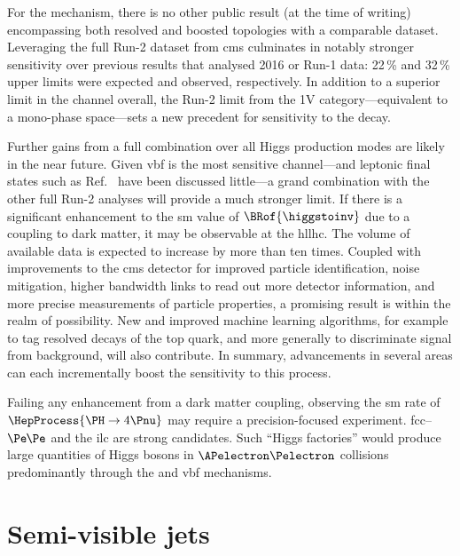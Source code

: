 For the \VH mechanism, there is no other public result (at the time of writing) encompassing both resolved and boosted topologies with a comparable dataset. Leveraging the full Run-2 dataset from \acrshort{cms} culminates in notably stronger sensitivity over previous results that analysed 2016 or Run-1 data: 22\,\% and 32\,\% upper limits were expected and observed, respectively. In addition to a superior limit in the \VH channel overall, the Run-2 limit from the 1V category---equivalent to a mono-\PVec phase space---sets a new precedent for sensitivity to the \higgstoinv decay.

Further gains from a full combination over all Higgs production modes are likely in the near future. Given \acrshort{vbf} is the most sensitive channel---and leptonic final states such as Ref.~ have been discussed little---a grand combination with the other full Run-2 analyses will provide a much stronger limit. If there is a significant enhancement to the \acrshort{sm} value of $\BRof{\higgstoinv}$ due to a coupling to dark matter, it may be observable at the \acrshort{hllhc}. The volume of available data is expected to increase by more than ten times. Coupled with improvements to the \acrshort{cms} detector for improved particle identification, noise mitigation, higher bandwidth links to read out more detector information, and more precise measurements of particle properties, a promising result is within the realm of possibility. New and improved machine learning algorithms, for example to tag resolved decays of the top quark, and more generally to discriminate signal from background, will also contribute. In summary, advancements in several areas can each incrementally boost the sensitivity to this process.

Failing any enhancement from a dark matter coupling, observing the \acrshort{sm} rate of $\HepProcess{\PH \to \text{4}\Pnu}$ may require a precision-focused experiment. \acrshort{fcc}--$\Pe\mkern-1mu\Pe$ and the \acrshort{ilc} are strong candidates. Such ``Higgs factories'' would produce large quantities of Higgs bosons in $\APelectron \Pelectron$ collisions predominantly through the \VH and \acrshort{vbf} mechanisms.




\section{Semi-visible jets}
\label{sec:conclusions_svj}


